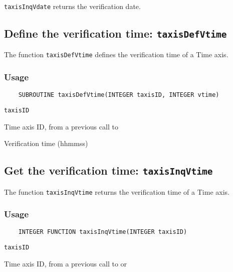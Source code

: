 {\tt taxisInqVdate} returns the verification date.



\subsection{Define the verification time: {\tt taxisDefVtime}}
\label{taxisDefVtime}

The function {\tt taxisDefVtime} defines the verification time of a Time axis.

\subsubsection*{Usage}

\begin{verbatim}
    SUBROUTINE taxisDefVtime(INTEGER taxisID, INTEGER vtime)
\end{verbatim}

\hspace*{4mm}\begin{minipage}[]{15cm}
\begin{deflist}{\tt taxisID\ }
\item[{\tt taxisID}]
Time axis ID, from a previous call to {}
\item[{\tt vtime}]
Verification time (hhmmss)

\end{deflist}
\end{minipage}


\subsection{Get the verification time: {\tt taxisInqVtime}}
\label{taxisInqVtime}

The function {\tt taxisInqVtime} returns the verification time of a Time axis.

\subsubsection*{Usage}

\begin{verbatim}
    INTEGER FUNCTION taxisInqVtime(INTEGER taxisID)
\end{verbatim}

\hspace*{4mm}\begin{minipage}[]{15cm}
\begin{deflist}{\tt taxisID\ }
\item[{\tt taxisID}]
Time axis ID, from a previous call to {} or {}

\end{deflist}
\end{minipage}


